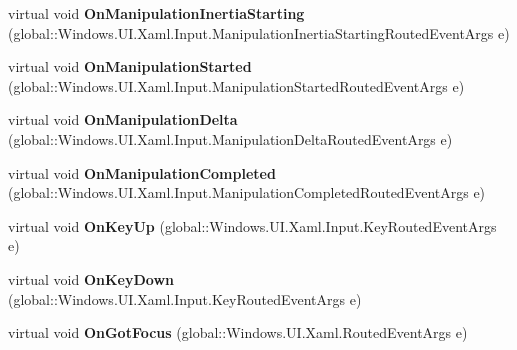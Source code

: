 \begin{DoxyCompactItemize}
virtual void {\bfseries On\+Manipulation\+Inertia\+Starting} (global\+::\+Windows.\+U\+I.\+Xaml.\+Input.\+Manipulation\+Inertia\+Starting\+Routed\+Event\+Args e)
\item 
\mbox{\label{class_windows_1_1_u_i_1_1_xaml_1_1_controls_1_1_control_aed97aaca4691b6260b928885e95b59a3}} 
virtual void {\bfseries On\+Manipulation\+Started} (global\+::\+Windows.\+U\+I.\+Xaml.\+Input.\+Manipulation\+Started\+Routed\+Event\+Args e)
\item 
\mbox{\label{class_windows_1_1_u_i_1_1_xaml_1_1_controls_1_1_control_ac8964a26bad230883f276d2a27377698}} 
virtual void {\bfseries On\+Manipulation\+Delta} (global\+::\+Windows.\+U\+I.\+Xaml.\+Input.\+Manipulation\+Delta\+Routed\+Event\+Args e)
\item 
\mbox{\label{class_windows_1_1_u_i_1_1_xaml_1_1_controls_1_1_control_a3304447f6f0bbb3c475cf58171d08f90}} 
virtual void {\bfseries On\+Manipulation\+Completed} (global\+::\+Windows.\+U\+I.\+Xaml.\+Input.\+Manipulation\+Completed\+Routed\+Event\+Args e)
\item 
\mbox{\label{class_windows_1_1_u_i_1_1_xaml_1_1_controls_1_1_control_a1b0d2df4f065db71ccbe2b00e5c5035f}} 
virtual void {\bfseries On\+Key\+Up} (global\+::\+Windows.\+U\+I.\+Xaml.\+Input.\+Key\+Routed\+Event\+Args e)
\item 
\mbox{\label{class_windows_1_1_u_i_1_1_xaml_1_1_controls_1_1_control_aaebebc38e0d403c52a9c26f0ce100664}} 
virtual void {\bfseries On\+Key\+Down} (global\+::\+Windows.\+U\+I.\+Xaml.\+Input.\+Key\+Routed\+Event\+Args e)
\item 
\mbox{\label{class_windows_1_1_u_i_1_1_xaml_1_1_controls_1_1_control_aebc0df2e4f8c22faf21c84575482274e}} 
virtual void {\bfseries On\+Got\+Focus} (global\+::\+Windows.\+U\+I.\+Xaml.\+Routed\+Event\+Args e)
\item 
\mbox{\label{class_windows_1_1_u_i_1_1_xaml_1_1_controls_1_1_control_a68f0c26b5b04bbbeb841be1d3a195224}} 

\end{DoxyCompactItemize}
